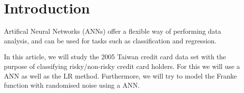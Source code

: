 \section{Introduction}
\label{sec:introduction}

Artifical Neural Networks (ANNs) offer a flexible way of performing data analysis, and can be used
for tasks such as classification and regression.

In this article, we will study the 2005 Taiwan credit card data set with the purpose
of classifying risky/non-risky credit card holders. For this we will use a ANN as well as the LR method.
Furthermore, we will try to model the Franke function with randomised noise using a ANN.

